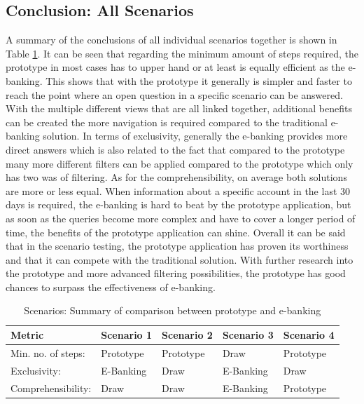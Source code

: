 
\subsection{Conclusion: All Scenarios}

A summary of the conclusions of all individual scenarios together is shown in Table \ref{tbl:scenariosummary}. It can be seen that regarding the minimum amount of steps required, the prototype in most cases has to upper hand or at least is equally efficient as the e-banking. This shows that with the prototype it generally is simpler and faster to reach the point where an open question in a specific scenario can be answered. With the multiple different views that are all linked together, additional benefits can be created the more navigation is required compared to the traditional e-banking solution. In terms of exclusivity, generally the e-banking provides more direct answers which is also related to the fact that compared to the prototype many more different filters can be applied compared to the prototype which only has two was of filtering. As for the comprehensibility, on average both solutions are more or less equal. When information about a specific account in the last 30 days is required, the e-banking is hard to beat by the prototype application, but as soon as the queries become more complex and have to cover a longer period of time, the benefits of the prototype application can shine. \newline
Overall it can be said that in the scenario testing, the prototype application has proven its worthiness and that it can compete with the traditional solution. With further research into the prototype and more advanced filtering possibilities, the prototype has good chances to surpass the effectiveness of e-banking.
\begin{table}[h]
	\begin{center}
		\begin{tabular}{ | p{3.2cm} | p{2.5cm} | p{2.5cm} | p{2.5cm} | p{2.5cm} | }
			\hline
			\textbf{Metric} & \textbf{Scenario 1} & \textbf{Scenario 2} & \textbf{Scenario 3} & \textbf{Scenario 4} \\
			\hline
			Min. no. of steps: & Prototype & Prototype & Draw & Prototype \\
			\hline
			Exclusivity: & E-Banking & Draw & E-Banking & Draw \\
			\hline
			Comprehensibility: & Draw & Draw & E-Banking & Prototype \\
			\hline
		\end{tabular}
		\caption{Scenarios: Summary of comparison between prototype and e-banking}
		\label{tbl:scenariosummary}
	\end{center}
\end{table} \newline


